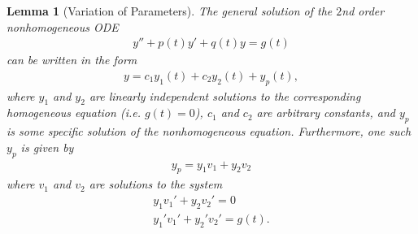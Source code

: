 \documentclass[12pt,reqno]{amsart}
\numberwithin{equation}{section}  %
\newtheorem{lemma}[theorem]{Lemma}
\begin{document}
\begin{lemma}[Variation of Parameters]
\label{lem:nonhomog-ode-soln}
The general solution of the $2$nd order nonhomogeneous ODE 
%
%
\begin{equation}
  \label{2nd-order-ode}
\begin{split}
y'' + p(t)y' + q(t)y = g(t)
\end{split}
\end{equation}
%
%
can be written in the form
%
%
\begin{equation*}
\begin{split}
  y = c_{1}y_{1}(t) + c_{2}y_{2}(t) + y_{p}(t),
\end{split}
\end{equation*}
%
%
where $y_{1}$ and $y_{2}$ are linearly independent solutions to the
corresponding homogeneous equation (i.e. $g(t) = 0$), $c_{1}$ and $c_{2}$ are
arbitrary constants, and $y_{p}$ is some specific solution of the nonhomogeneous
equation. Furthermore, one such $y_{p}$ is given by
%
%
\begin{equation}
  \label{2nd-order-ansatz}
\begin{split}
  y_{p} = y_{1}v_{1} + y_{2} v_{2}
\end{split}
\end{equation}
%
%
where $v_{1}$ and $v_{2}$ are solutions to the system
\begin{gather}
  \label{cancel-rel-1}
  y_{1} v_{1}' + y_{2} v_{2}' = 0
  \\
  \label{cancel-rel-2}
  y_{1}' v_{1}' + y_{2}' v_{2}' = g(t).
\end{gather}
\end{lemma}
%
\end{document}

